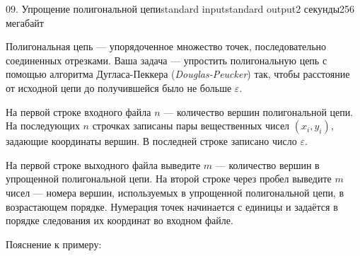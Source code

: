 ﻿\begin{problem}{09. Упрощение полигональной цепи}{standard input}{standard output}{2 секунды}{256 мегабайт}

Полигональная цепь — упорядоченное множество точек, последовательно соединенных отрезками.
Ваша задача — упростить полигональную цепь с помощью алгоритма Дугласа-Пеккера (\emph{Douglas-Peucker}) так,
чтобы расстояние от исходной цепи до получившейся было не больше $\varepsilon$.

\InputFile

На первой строке входного файла $n$ — количество вершин полигональной цепи.
На последующих $n$ строчках записаны пары вещественных чисел $(x_i, y_i)$, задающие координаты вершин.
В последней строке записано число $\varepsilon$.

\OutputFile

На первой строке выходного файла выведите $m$ — количество вершин в упрощенной полигональной цепи.
На второй строке через пробел выведите $m$ чисел — номера вершин, используемых в упрощенной полигональной цепи, в возрастающем порядке.
Нумерация точек начинается с единицы и задаётся в порядке следования их координат во входном файле.

\Examples

\begin{example}%
%
\end{example}
\Note
Пояснение к примеру:
	\begin{center}
	\begin{figure}[htb]
\end{figure}
\end{center}
\end{problem}

